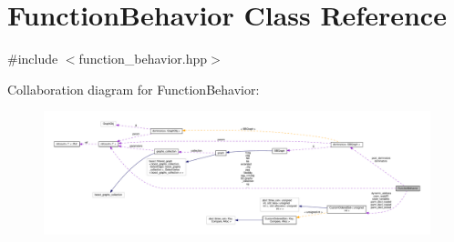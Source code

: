 \hypertarget{classFunctionBehavior}{}\section{Function\+Behavior Class Reference}
\label{classFunctionBehavior}


{\ttfamily \#include $<$function\+\_\+behavior.\+hpp$>$}



Collaboration diagram for Function\+Behavior\+:
\nopagebreak
\begin{figure}[H]
\begin{center}
\leavevmode
\includegraphics[width=350pt]{d2/d46/classFunctionBehavior__coll__graph}
\end{center}
\end{figure}
